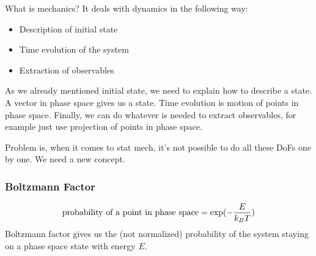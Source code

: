 \documentclass[letterpaper,10pt,english]{sphinxmanual}
\begin{document}
What is mechanics? It deals with dynamics in the following way:
\begin{itemize}
\item {} 
Description of initial state

\item {} 
Time evolution of the system

\item {} 
Extraction of observables

\end{itemize}

As we already mentioned initial state, we need to explain how to describe a state. A vector in phase space gives us a state. Time evolution is motion of points in phase space. Finally, we can do whatever is needed to extract observables, for example just use projection of points in phase space.

Problem is, when it comes to stat mech, it's not possible to do all these DoFs one by one. We need a new concept.


\subsubsection{Boltzmann Factor}
\label{equilibrium/week1:boltzmann-factor}\begin{gather}
\begin{split}\text{probability of a point in phase space} = \exp(-\frac{E}{k_B T})\end{split}\notag
\end{gather}
Boltzmann factor gives us the (not normalized) probability of the system staying on a phase space state with energy $E$.
\end{document}
